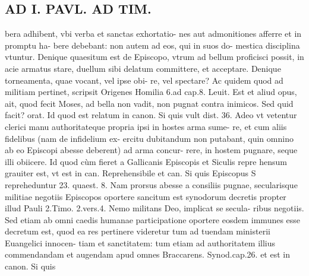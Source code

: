 \documentclass{article}
\begin{document}
\begin{pages}
\section*{AD I. PAVL. AD TIM. }
\marginpar{[ p.334 ]}\pstart bera adhibent, vbi verba et sanctas exhortatio- nes aut admonitiones afferre et in promptu ha- bere debebant: non autem ad eos, qui in suos do- mestica disciplina vtuntur.  \pend\pstart Denique quaesitum est de Episcopo, vtrum ad bellum proficisci possit, in acie armatus stare, duellum sibi delatum committere, et acceptare. Denique torneamenta, quae vocant, vel ipse obi- re, vel spectare? Ac quidem quod ad militiam pertinet, scripsit Origenes Homilia 6.ad cap.8. Leuit. Est et aliud opus, ait, quod fecit Moses, ad bella non vadit, non pugnat contra inimicos. Sed quid facit? orat. Id quod est relatum in canon. Si quis vult dist. 36. Adeo vt vetentur clerici manu authoritateque  propria ipsi in hostes arma sume- re, et cum aliis fidelibus (nam de infidelium ex- ercitu dubitandum non putabant, quin omnino ab eo Episcopi abesse deberent) ad arma concur- rere, in hostem pugnare, seque  illi obiicere. Id quod cùm fieret a Gallicanis Episcopis et Siculis repre hensum grauiter est, vt est in can. Reprehensibile et can. Si quis Episcopus S repreheduntur 23. quaest. 8. Nam prorsus abesse a consiliis pugnae, secularisque  militiae negotiis Episcopos oportere sancitum est synodorum decretis propter illud Pauli 2.Timo. 2.vers.4. Nemo militans Deo, implicat se secula- ribus negotiis. Sed etiam ab omni caedis humanae participatione oportere eosdem immunes esse decretum est, quod ea res pertinere videretur tum ad tuendam ministerii Euangelici innocen- tiam et sanctitatem: tum etiam ad authoritatem illius commendandam et augendam apud omnes Braccarens. Synod.cap.26. et est in canon. Si quis  \pend

\end{pages}
\end{document}
